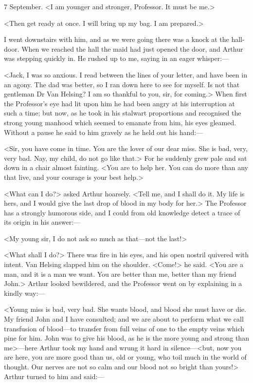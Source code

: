\begin{diary}{7 September.}
<I am younger and stronger, Professor. It must be me.>

<Then get ready at once. I will bring up my bag. I am prepared.>

I went downstairs with him, and as we were going there was a knock at the hall-door. When we reached the hall the maid had just opened the door, and Arthur was stepping quickly in. He rushed up to me, saying in an eager whisper:—

<Jack, I was so anxious. I read between the lines of your letter, and have been in an agony. The dad was better, so I ran down here to see for myself. Is not that gentleman Dr Van Helsing? I am so thankful to you, sir, for coming.> When first the Professor's eye had lit upon him he had been angry at his interruption at such a time; but now, as he took in his stalwart proportions and recognised the strong young manhood which seemed to emanate from him, his eyes gleamed. Without a pause he said to him gravely as he held out his hand:—

<Sir, you have come in time. You are the lover of our dear miss. She is bad, very, very bad. Nay, my child, do not go like that.> For he suddenly grew pale and sat down in a chair almost fainting. <You are to help her. You can do more than any that live, and your courage is your best help.>

<What can I do?> asked Arthur hoarsely. <Tell me, and I shall do it. My life is hers, and I would give the last drop of blood in my body for her.> The Professor has a strongly humorous side, and I could from old knowledge detect a trace of its origin in his answer:—

<My young sir, I do not ask so much as that—not the last!>

<What shall I do?> There was fire in his eyes, and his open nostril quivered with intent. Van Helsing slapped him on the shoulder. <Come!> he said. <You are a man, and it is a man we want. You are better than me, better than my friend John.> Arthur looked bewildered, and the Professor went on by explaining in a kindly way:—

<Young miss is bad, very bad. She wants blood, and blood she must have or die. My friend John and I have consulted; and we are about to perform what we call transfusion of blood—to transfer from full veins of one to the empty veins which pine for him. John was to give his blood, as he is the more young and strong than me>—here Arthur took my hand and wrung it hard in silence—<but, now you are here, you are more good than us, old or young, who toil much in the world of thought. Our nerves are not so calm and our blood not so bright than yours!> Arthur turned to him and said:—


\end{diary}
